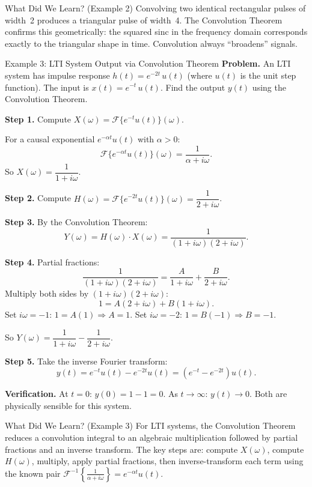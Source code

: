 \documentclass[12pt,a4paper]{article}
\begin{document}
\begin{learnbox}{What Did We Learn? (Example 2)}
Convolving two identical rectangular pulses of width~2 produces a triangular
pulse of width~4. The Convolution Theorem confirms this geometrically: the
squared sinc in the frequency domain corresponds exactly to the triangular shape
in time. Convolution always ``broadens'' signals.
\end{learnbox}

\begin{infobox}{Example 3: LTI System Output via Convolution Theorem}
\textbf{Problem.} An LTI system has impulse response $h(t) = e^{-2t}\,u(t)$
(where $u(t)$ is the unit step function). The input is $x(t) = e^{-t}\,u(t)$.
Find the output $y(t)$ using the Convolution Theorem.

\medskip
\textbf{Step 1.} Compute $X(\omega) = \mathcal{F}\{e^{-t}u(t)\}(\omega)$.

For a causal exponential $e^{-\alpha t}u(t)$ with $\alpha > 0$:
\[
  \mathcal{F}\{e^{-\alpha t}u(t)\}(\omega) = \frac{1}{\alpha + i\omega}.
\]
So $X(\omega) = \dfrac{1}{1+i\omega}$.

\textbf{Step 2.} Compute $H(\omega) = \mathcal{F}\{e^{-2t}u(t)\}(\omega) = \dfrac{1}{2+i\omega}$.

\textbf{Step 3.} By the Convolution Theorem:
\[
  Y(\omega) = H(\omega)\cdot X(\omega) = \frac{1}{(1+i\omega)(2+i\omega)}.
\]

\textbf{Step 4.} Partial fractions:
\[
  \frac{1}{(1+i\omega)(2+i\omega)}
  = \frac{A}{1+i\omega} + \frac{B}{2+i\omega}.
\]
Multiply both sides by $(1+i\omega)(2+i\omega)$:
\[
  1 = A(2+i\omega) + B(1+i\omega).
\]
Set $i\omega = -1$: $1 = A(1) \Rightarrow A = 1$.
Set $i\omega = -2$: $1 = B(-1) \Rightarrow B = -1$.

So $Y(\omega) = \dfrac{1}{1+i\omega} - \dfrac{1}{2+i\omega}$.

\textbf{Step 5.} Take the inverse Fourier transform:
\[
  y(t) = e^{-t}u(t) - e^{-2t}u(t) = \left(e^{-t} - e^{-2t}\right)u(t).
\]

\textbf{Verification.} At $t=0$: $y(0) = 1 - 1 = 0$. As $t\to\infty$: $y(t)\to 0$.
Both are physically sensible for this system.
\end{infobox}

\begin{learnbox}{What Did We Learn? (Example 3)}
For LTI systems, the Convolution Theorem reduces a convolution integral to an
algebraic multiplication followed by partial fractions and an inverse transform.
The key steps are: compute $X(\omega)$, compute $H(\omega)$, multiply, apply
partial fractions, then inverse-transform each term using the known pair
$\mathcal{F}^{-1}\!\left\{\frac{1}{\alpha+i\omega}\right\} = e^{-\alpha t}u(t)$.
\end{learnbox}
\end{document}
